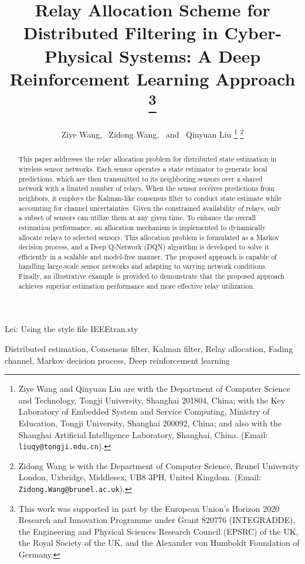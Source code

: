\documentclass[twocolumn]{IEEEtran}
\begin{document}
\title{{Relay Allocation Scheme for Distributed Filtering in Cyber-Physical Systems: A Deep Reinforcement Learning Approach
}
\thanks{This work was supported in part by the European Union's Horizon 2020 Research and Innovation Programme under Grant 820776 (INTEGRADDE), the Engineering and Physical Sciences Research Council (EPSRC) of the UK, the Royal Society of the UK, and the Alexander von Humboldt Foundation of Germany.}}

\author{Ziye Wang, ~Zidong Wang, ~and ~Qinyuan Liu
\thanks{Ziye Wang and Qinyuan Liu are with the Department of Computer Science and Technology, Tongji University, Shanghai 201804, China; with the Key Laboratory of Embedded System and Service Computing, Ministry of Education, Tongji University, Shanghai 200092, China; and also with the Shanghai Artificial Intelligence Laboratory, Shanghai, China. (Email: {\tt liuqy@tongji.edu.cn}).}
\thanks{Zidong Wang is with the Department of Computer Science, Brunel University London, Uxbridge, Middlesex, UB8 3PH, United Kingdom. (Email: {\tt Zidong.Wang@brunel.ac.uk}).}
}

 {Lei: Using the style file IEEEtran.sty} \maketitle

\begin{abstract}
This paper addresses the relay allocation problem for distributed state estimation in wireless sensor networks. Each sensor operates a state estimator to generate local predictions, which are then transmitted to its neighboring sensors over a shared network with a limited number of relays. When the sensor receives predictions from neighbors, it employs the Kalman-like consensus filter to conduct state estimate while accounting for channel uncertainties. Given the constrained availability of relays, only a subset of sensors can utilize them at any given time. To enhance the overall estimation performance, an allocation mechanism is implemented to dynamically allocate relays to selected sensors. This allocation problem is formulated as a Markov decision process, and a Deep Q-Network (DQN) algorithm is developed to solve it efficiently in a scalable and model-free manner. The proposed approach is capable of handling large-scale sensor networks and adapting to varying network conditions. Finally, an illustrative example is provided to demonstrate that the proposed approach achieves superior estimation performance and more effective relay utilization.
\end{abstract}
\begin{keywords}
Distributed estimation, Consensus filter, Kalman
filter,  Relay allocation, Fading channel, Markov decision process, Deep reinforcement learning  
\end{keywords}
\end{document}
